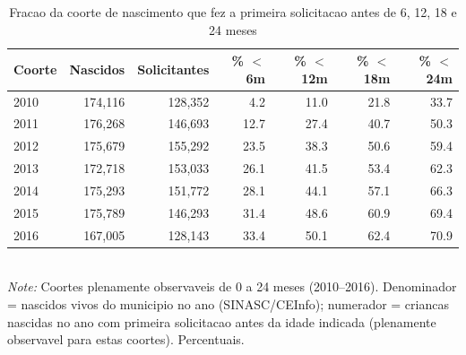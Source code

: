 \begin{table}[htbp]\centering
\caption{Fracao da coorte de nascimento que fez a primeira solicitacao antes de 6, 12, 18 e 24 meses}
\label{tab:S2a_frac_0_24}
\small
\begin{tabular}{lrrrrrr}
\toprule
Coorte & Nascidos & Solicitantes & \% $<$6m & \% $<$12m & \% $<$18m & \% $<$24m \\
\midrule
2010 & 174,116 & 128,352 & 4.2 & 11.0 & 21.8 & 33.7 \\
2011 & 176,268 & 146,693 & 12.7 & 27.4 & 40.7 & 50.3 \\
2012 & 175,679 & 155,292 & 23.5 & 38.3 & 50.6 & 59.4 \\
2013 & 172,718 & 153,033 & 26.1 & 41.5 & 53.4 & 62.3 \\
2014 & 175,293 & 151,772 & 28.1 & 44.1 & 57.1 & 66.3 \\
2015 & 175,789 & 146,293 & 31.4 & 48.6 & 60.9 & 69.4 \\
2016 & 167,005 & 128,143 & 33.4 & 50.1 & 62.4 & 70.9 \\
\bottomrule
\end{tabular}
\\[3pt]{\footnotesize \textit{Note:} Coortes plenamente observaveis de 0 a 24 meses (2010--2016). Denominador = nascidos vivos do municipio no ano (SINASC/CEInfo); numerador = criancas nascidas no ano com primeira solicitacao antes da idade indicada (plenamente observavel para estas coortes). Percentuais.}
\end{table}
